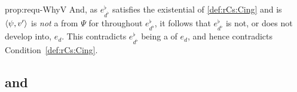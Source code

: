 \begin{note}
\begin{argument}{prop:requ-WhyV}
    And, as \(e^{\flat}_{d^{\flat}}\) satisfies the existential of \ref{def:rCs:Cing} and is \(\langle \psi, v' \rangle\) is \emph{not} a  from \(\Psi\) for \vAgent{} throughout \(e^{\flat}_{d^{\flat}}\), it follows that \(e^{\flat}_{d^{\flat}}\) is not, or does not develop into, \(e_{d}\).
    This contradicts \(e^{\flat}_{d^{\flat}}\) being a  of \(e_{d}\), and hence contradicts Condition~\ref{def:rCs:Cing}.
  \end{argument}
\end{note}



\subsection{ and \issueConstraint{}}
\label{cha:binding:sec:requ-iC}

